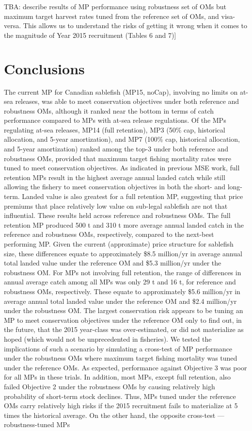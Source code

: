 \documentclass[11pt]{book}
\begin{document}
TBA: describe results of MP performance using robustness set of OMs but maximum target harvest rates tuned from the reference set of OMs, and visa-versa. This allows us to understand the risks of getting it wrong when it comes to the magnitude of Year 2015 recruitment (Tables 6 and 7){]}

\hypertarget{conclusions}{%
\section{Conclusions}\label{conclusions}}

The current MP for Canadian sablefish (MP15, noCap), involving no limits on at-sea releases, was able to meet conservation objectives under both reference and robustness OMs, although it ranked near the bottom in terms of catch performance compared to MPs with at-sea release regulations. Of the MPs regulating at-sea releases, MP14 (full retention), MP3 (50\% cap, historical allocation, and 5-year amortization), and MP7 (100\% cap, historical allocation, and 5-year amortization) ranked among the top-3 under both reference and robustness OMs, provided that maximum target fishing mortality rates were tuned to meet conservation objectives. As indicated in previous MSE work, full retention MPs result in the highest average annual landed catch while still allowing the fishery to meet conservation objectives in both the short- and long-term. Landed value is also greatest for a full retention MP, suggesting that price premiums that place relatively low value on sub-legal sablefish are not that influential. These results held across reference and robustness OMs. The full retention MP produced 500 t and 310 t more average annual landed catch in the reference and robustness OMs, respectively, compared to the next-best performing MP. Given the current (approximate) price structure for sablefish size, these differences equate to approximately \$8.5 million/yr in average annual total landed value under the reference OM and \$5.3 million/yr under the robustness OM. For MPs not involving full retention, the range of differences in annual average catch among all MPs was only 29 t and 16 t, for reference and robustness OMs, respectively. These equate to approximately \$5.6 million/yr in average annual total landed value under the reference OM and \$2.4 million/yr under the robustness OM. The largest conservation risk appears to be tuning an MP to meet conservation objectives under the reference OM only to find out, in the future, that the 2015 year-class was over-estimated, or did not materialize as hoped (which would not be unprecedented in fisheries). We tested the implications of such a scenario by simulating a cross-test of MP performance under the robustness OMs where maximum target fishing mortality was tuned under the reference OMs. As expected, performance against Objective 3 was poor for all MPs in these trials. In addition, most MPs, except full retention, also failed Objective 2 under the robustness OMs by causing relatively high probability of short-term stock declines. Thus, MPs tuned under the reference OMs carry relatively high risks if the 2015 recruitment fails to materialize at 5 times the historical average. On the other hand, the opposite cross-test --- robustness-tuned MPs 
\end{document}
